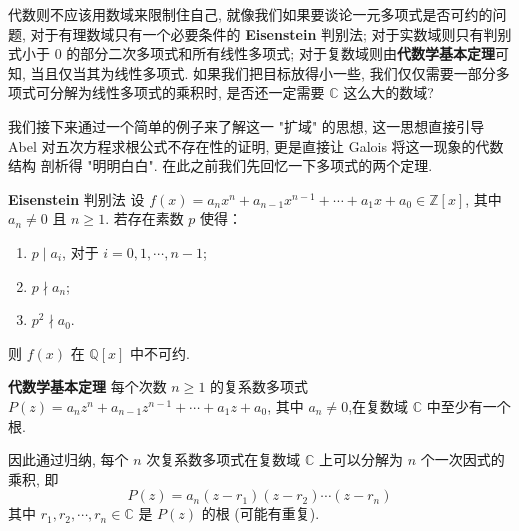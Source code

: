 \documentclass[UTF8]{book}
\begin{document}
代数则不应该用数域来限制住自己, 就像我们如果要谈论一元多项式是否可约的问题, 
对于有理数域只有一个必要条件的 \textbf{Eisenstein} 判别法; 
对于实数域则只有判别式小于 0 的部分二次多项式和所有线性多项式; 
对于复数域则由\textbf{代数学基本定理}可知, 当且仅当其为线性多项式. 
如果我们把目标放得小一些, 我们仅仅需要一部分多项式可分解为线性多项式的乘积时, 
是否还一定需要 $\mathbb{C}$ 这么大的数域? 

我们接下来通过一个简单的例子来了解这一 "扩域" 的思想, 这一思想直接引导 Abel 
对五次方程求根公式不存在性的证明, 更是直接让 Galois 将这一现象的代数结构
剖析得 "明明白白". 在此之前我们先回忆一下多项式的两个定理. 

\begin{theorem}
    \textbf{Eisenstein} 判别法 
    设 \(f(x)=a_nx^n + a_{n - 1}x^{n - 1}+\cdots+a_1x + a_0\in\mathbb{Z}[x]\), 
    其中 \(a_n\neq0\) 且 \(n\geq1\). 若存在素数 \(p\) 使得：
    \begin{enumerate}
        \item \(p\mid a_i\), 对于 \(i = 0,1,\cdots,n - 1\); 
        \item \(p\nmid a_n\); 
        \item \(p^2\nmid a_0\).
    \end{enumerate}
则 \(f(x)\) 在 \(\mathbb{Q}[x]\) 中不可约. 
\end{theorem}

\begin{theorem}
    \textbf{代数学基本定理} 
    每个次数 \(n\geq1\) 的复系数多项式 
    \(P(z)=a_nz^n + a_{n - 1}z^{n - 1}+\cdots+a_1z + a_0\), 
    其中 \(a_n\neq0\),在复数域 \(\mathbb{C}\) 
    中至少有一个根. 

    因此通过归纳, 每个 \(n\) 次复系数多项式在复数域 \(\mathbb{C}\) 
    上可以分解为 \(n\) 个一次因式的乘积, 即
    \[P(z)=a_n(z - r_1)(z - r_2)\cdots(z - r_n)\]
    其中 \(r_1,r_2,\cdots,r_n\in\mathbb{C}\) 是 \(P(z)\) 的根 
    (可能有重复). 
\end{theorem}
\end{document}
